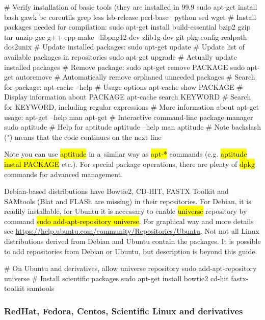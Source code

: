 \documentclass[a4paper, 11pt, twoside]{article}
\renewcommand{\texttt}[1]{\hl{\ttfamily #1}}
\begin{document}
\begin{bashcode}
  # Verify installation of basic tools (they are installed in 99.9%
  sudo apt-get install bash gawk bc coreutils grep less lsb-release perl-base \
    python sed wget
  # Install packages needed for compilation:
  sudo apt-get install build-essential bzip2 gzip tar unzip gcc g++ cpp make \
    libpng12-dev zlib1g-dev git pkg-config realpath dos2unix
  # Update installed packages:
  sudo apt-get update # Update list of available packages in repositories
  sudo apt-get upgrade # Actually update installed packages
  # Remove package:
  sudo apt-get remove PACKAGE
  sudo apt-get autoremove # Automatically remove orphaned unneeded packages
  # Search for package:
  apt-cache --help # Usage options
  apt-cache show PACKAGE # Display information about PACKAGE
  apt-cache search KEYWORD # Search for KEYWORD, including regular expressions
  # More information about apt-get usage:
  apt-get --help
  man apt-get
  # Interactive command-line package manager
  sudo aptitude
  # Help for aptitude
  aptitude --help
  man aptitude
  # Note backslash ("\") means that the code continues on the next line
\end{bashcode}

Note you can use \texttt{aptitude} in a~similar way as \texttt{apt-*} commands (e.g. \texttt{aptitude instal PACKAGE} etc.). For special package operations, there are plenty of \texttt{dpkg} commands for advanced management.

Debian-based distributions have Bowtie2, CD-HIT, FASTX Toolkit and SAMtools (Blat and FLASh are missing) in their repositories. For Debian, it is readily installable, for Ubuntu it is necessary to enable \texttt{universe} repository by command \texttt{sudo add-apt-repository universe}. For graphical way and more details see \url{https://help.ubuntu.com/community/Repositories/Ubuntu}. Not not all Linux distributions derived from Debian and Ubuntu contain the packages. It is possible to add repositories from Debian or Ubuntu, but description is beyond this guide.

\begin{bashcode}
  # On Ubuntu and derivatives, allow universe repository
  sudo add-apt-repository universe
  # Install scientific packages
  sudo apt-get install bowtie2 cd-hit fastx-toolkit samtools
\end{bashcode}

\subsubsection{RedHat, Fedora, Centos, Scientific Linux and derivatives}
\end{document}
